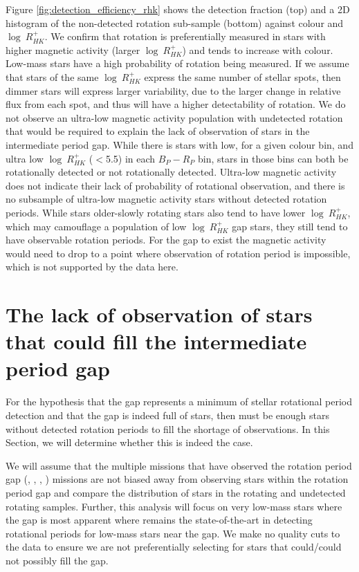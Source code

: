 Figure \ref{fig:detection_efficiency_rhk} shows the detection fraction (top) and a 2D histogram of the non-detected rotation sub-sample (bottom) against colour and $\log \ R^{+}_{HK}$. 
We confirm that rotation is preferentially measured in stars with higher magnetic activity (larger $\log \ R^{+}_{HK}$) and tends to increase with colour. 
Low-mass stars have a high probability of rotation being measured.
If we assume that stars of the same $\log \ R^{+}_{HK}$ express the same number of stellar spots, then dimmer stars will express larger variability, due to the larger change in relative flux from each spot, and thus will have a higher detectability of rotation.
We do not observe an ultra-low magnetic activity population with undetected rotation that would be required to explain the lack of observation of stars in the intermediate period gap.
While there is stars with low, for a given colour bin, and ultra low $\log \ R^{+}_{HK}$ ($<$5.5) in each $B_P-R_P$ bin, stars in those bins can both be rotationally detected or not rotationally detected. 
Ultra-low magnetic activity does not indicate their lack of probability of rotational observation, and there is no subsample of ultra-low magnetic activity stars without detected rotation periods.
While stars older-slowly rotating stars also tend to have lower $\log \ R^{+}_{HK}$, which may camouflage a population of low $\log \ R^{+}_{HK}$ gap stars, they still tend to have observable rotation periods.
For the gap to exist the magnetic activity would need to drop to a point where observation of rotation period is impossible, which is not supported by the data here.

\section{The lack of observation of stars that could fill the intermediate period gap}
\label{sec:no_gap_stars}

For the hypothesis that the gap represents a minimum of stellar rotational period detection and that the gap is indeed full of stars, then must be enough stars without detected rotation periods to fill the shortage of observations.
In this Section, we will determine whether this is indeed the case.

We will assume that the multiple missions that have observed the rotation period gap (\kepler, \ktoo, \ZTF, \tess) missions are not biased away from observing stars within the rotation period gap and compare the distribution of stars in the \citet{mcquillan_rotation_2014} \kepler{} rotating and undetected rotating samples.
Further, this analysis will focus on very low-mass stars where the gap is most apparent where \citet{mcquillan_rotation_2014} remains the state-of-the-art in detecting rotational periods for low-mass stars near the gap.
We make no quality cuts to the data to ensure we are not preferentially selecting for stars that could/could not possibly fill the gap.


